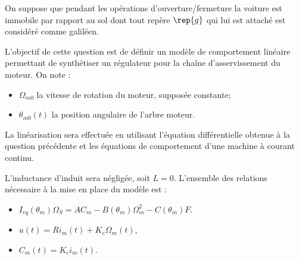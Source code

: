 On suppose que pendant les opérations d’ouverture/fermeture la voiture est
immobile par rapport au sol dont tout repère $\rep{g}$ qui lui est attaché est considéré
comme galiléen.

\ifprof
\begin{corrige}
\end{corrige}
\else
\fi


L’objectif de cette question est de définir un modèle de comportement
linéaire permettant de synthétiser un régulateur pour la chaîne d’asservissement
du moteur. On note :
\begin{itemize}
\item $\Omega_{m0}$ la vitesse de rotation du moteur, supposée constante;
\item $\theta_{m0}(t)$ la position angulaire de l’arbre moteur.
\end{itemize}
La linéarisation sera effectuée en utilisant l’équation différentielle obtenue à la
question précédente et les équations de comportement d’une
machine à courant continu.

L’inductance d’induit sera négligée, soit $L=0$.
L’ensemble des relations nécessaire à la mise en place du modèle est :
\begin{itemize}
 \item $I_{eq}\left( \theta_m\right)\dot{\Omega}_S = AC_m-B\left( \theta_m\right)\Omega_m^2-C\left( \theta_m\right)F$.
 \item $u(t)=Ri_m(t)+K_e\Omega_m(t)$, 
 \item $C_m(t)=K_ci_m(t)$.
\end{itemize}

\ifprof
\begin{corrige}
\end{corrige}
\else
\fi

